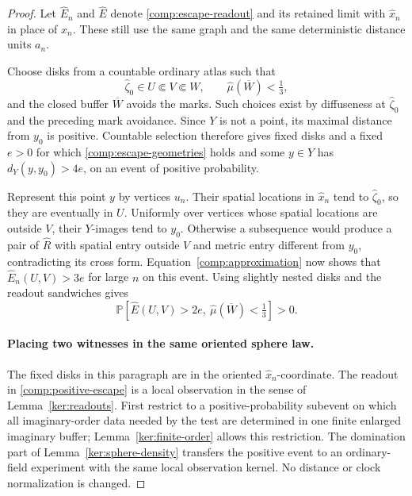 \documentclass[11pt]{article}
\numberwithin{equation}{section}
\theoremstyle{definition}
\theoremstyle{remark}
\newcommand{\PP}{\mathbb P}
\newcommand{\1}{\mathbf 1}
\begin{document}
\begin{proof}
Let $\widehat E_n$ and $\widehat E$ denote
\eqref{comp:escape-readout} and its retained limit with
$\widehat x_n$ in place of $x_n$.  These still use the same graph
and the same deterministic distance units $a_n$.

Choose disks from a countable ordinary atlas such that
\begin{equation}
 \label{comp:escape-geometries}
 \widehat\zeta_0\in U\Subset V\Subset W,\qquad
 \widehat\mu(\overline W)<\tfrac13,
\end{equation}
and the closed buffer $\overline W$ avoids the marks.  Such choices
exist by diffuseness at $\widehat\zeta_0$ and the preceding mark avoidance.
Since $Y$ is not a point, its maximal distance from $y_0$ is
positive.  Countable selection therefore gives fixed disks and
a fixed $e>0$ for which \eqref{comp:escape-geometries} holds and
some $y\in Y$ has $d_Y(y,y_0)>4e$, on an event of positive
probability.

Represent this point $y$ by vertices $u_n$.  Their spatial
locations in $\widehat x_n$ tend to $\widehat\zeta_0$, so they are
eventually in $U$.  Uniformly
over vertices whose spatial locations are outside $V$, their
$Y$-images tend to $y_0$.  Otherwise a subsequence would produce
a pair of $\widehat R$ with spatial entry outside $V$ and metric
entry different from $y_0$, contradicting its cross form.
Equation~\eqref{comp:approximation} now shows that
$\widehat E_n(U,V)>3e$ for large $n$ on this event.
Using slightly nested disks and the readout sandwiches gives
\begin{equation}
 \label{comp:positive-escape}
 \PP\left[\widehat E(U,V)>2e,\
          \widehat\mu(\overline W)<\tfrac13\right]>0.
\end{equation}

\paragraph{Placing two witnesses in the same oriented sphere law.}
The fixed disks in this paragraph are in the oriented
$\widehat x_n$-coordinate.  The readout in
\eqref{comp:positive-escape} is a local observation
in the sense of Lemma~\ref{ker:readouts}.  First restrict to a
positive-probability subevent on which all imaginary-order data
needed by the test are determined in one finite enlarged
imaginary buffer; Lemma~\ref{ker:finite-order} allows this
restriction.  The domination part of
Lemma~\ref{ker:sphere-density} transfers the positive event to an
ordinary-field experiment with the same local observation
kernel.  No distance or clock normalization is changed.


\end{proof}
\end{document}
